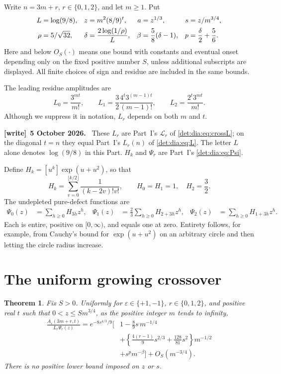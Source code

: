 \documentclass[11pt,letterpaper]{article}
\numberwithin{equation}{section}
\newtheorem{theorem}{Theorem}[section]
\theoremstyle{definition}\newtheorem{definition}[theorem]{Definition}
\theoremstyle{remark}\newtheorem{remark}[theorem]{Remark}
\newcommand{\eps}{\varepsilon}
\newenvironment{writenote}[1][]{\par\smallskip\begingroup\small
 \noindent\textbf{[write]}\if\relax\detokenize{#1}\relax\else~\textbf{#1.}\fi\ }%
 {\par\endgroup\smallskip}
\begin{document}
Write $n=3m+r$, $r\in\{0,1,2\}$, and let $m\ge1$. Put
\begin{align}\label{det:grow:eq:variables}
 L&=\log(9/8),& z&=m^2(8/9)^t,& a&=z^{1/3},&
 s&=z/m^{3/4},\\
 \rho&=5/\sqrt{32},&
 \delta&=\frac{2\log(1/\rho)}{L},&
 \beta&=\frac58(\delta-1),&p&=\frac\delta2+\frac56.\notag
\end{align}
Here and below $O_S(\cdot)$ means one bound with constants and eventual
onset depending only on the fixed positive number $S$, unless additional
subscripts are displayed. All finite choices of sign and residue are
included in the same bounds.

The leading residue amplitudes are
\begin{equation}\label{det:grow:eq:amplitudes}
 L_0=\frac{3^{mt}}{m!},\qquad
 L_1=\frac32\frac{4^t3^{(m-1)t}}{(m-1)!},\qquad
 L_2=\frac{2^t3^{mt}}{m!}.
\end{equation}
Although we suppress it in notation, $L_r$ depends on both $m$ and $t$.
\begin{writenote}[5 October 2026]
These $L_r$ are Part~I's $\mathcal L_r$ of \eqref{det:dia:eq:crossL}; on the diagonal $t=n$ they equal Part~I's $L_r(n)$ of \eqref{det:dia:eq:L}. The letter $L$ alone denotes $\log(9/8)$ in this Part. $H_k$ and $\Psi_r$ are Part~I's \eqref{det:dia:eq:Psi}.
\end{writenote}
Define $H_k=[u^k]\exp(u+u^2)$, so that
\begin{equation}\label{det:grow:eq:H}
 H_k=\sum_{v=0}^{\lfloor k/2\rfloor}\frac{1}{(k-2v)!v!},\qquad
 H_0=H_1=1,\quad H_2=\frac32.
\end{equation}
The undepleted pure-defect functions are
\begin{align}\label{det:grow:eq:Psi}
 \Psi_0(z)&=\sum_{h\ge0}H_{3h}z^h,&
 \Psi_1(z)&=\frac23\sum_{h\ge0}H_{2+3h}z^h,&
 \Psi_2(z)&=\sum_{h\ge0}H_{1+3h}z^h.
\end{align}
Each is entire, positive on $[0,\infty)$, and equals one at zero. Entirety
follows, for example, from Cauchy's bound for $\exp(u+u^2)$ on an arbitrary
circle and then letting the circle radius increase.

\section{The uniform growing crossover}
\begin{theorem}\label{det:grow:thm:forward}
Fix $S>0$. Uniformly for $\eps\in\{+1,-1\}$, $r\in\{0,1,2\}$, and
positive real $t$ such that $0<z\le S m^{3/4}$, as the positive integer
$m$ tends to infinity,
\begin{equation}\label{det:grow:eq:forward}
\begin{aligned}
 \frac{A_\eps(3m+r,t)}{L_r\Psi_r(z)}
 =e^{-8s^{4/3}/9}\bigg[&1-\frac89s\,m^{-1/4}\\
 &+\left\{\frac{4(r-1)}9s^{2/3}+\frac{128}{81}s^2\right\}m^{-1/2}\\
 &+s^p m^{-\beta}\bigg]+O_S(m^{-3/4}).
\end{aligned}
\end{equation}
There is no positive lower bound imposed on $z$ or $s$.
\end{theorem}
\end{document}
